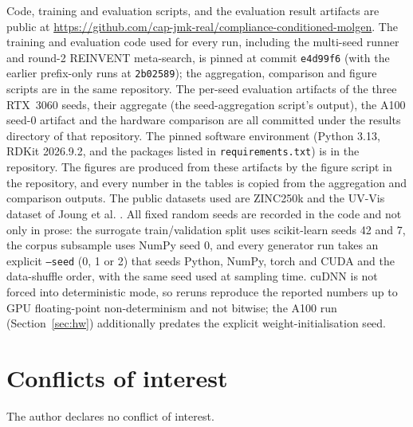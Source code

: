 \documentclass[11pt]{article}
\begin{document}
Code, training and evaluation scripts, and the evaluation result artifacts are public at
\url{https://github.com/cap-jmk-real/compliance-conditioned-molgen}. The training and
evaluation code used for every run, including the multi-seed runner and round-2
REINVENT meta-search, is pinned at commit \texttt{e4d99f6} (with the earlier prefix-only
runs at \texttt{2b02589}); the aggregation, comparison and figure scripts are in the same
repository. The per-seed evaluation artifacts of the three RTX~3060 seeds, their aggregate (the
seed-aggregation script's output), the A100 seed-0 artifact and the hardware comparison are
all committed under the results directory of that repository. The pinned software
environment (Python 3.13, RDKit 2026.9.2, and the packages listed in
\texttt{requirements.txt}) is in the repository. The figures are produced from these
artifacts by the figure script in the repository, and every number in the tables is
copied from the aggregation and comparison outputs. The public datasets used are ZINC250k
\cite{sterling2015zinc15} and the UV-Vis dataset of Joung et al. \cite{joung2020uvvis}. All
fixed random seeds are recorded in the code and not only in prose: the surrogate
train/validation split uses scikit-learn seeds 42 and 7, the corpus subsample uses NumPy
seed 0, and every generator run takes an explicit \texttt{--seed} (0, 1 or 2) that seeds
Python, NumPy, torch and CUDA and the data-shuffle order, with the same seed used at
sampling time. cuDNN is not forced into deterministic mode, so reruns reproduce the
reported numbers up to GPU floating-point non-determinism and not bitwise; the A100 run
(Section~\ref{sec:hw}) additionally predates the explicit weight-initialisation seed.

\section*{Conflicts of interest}

The author declares no conflict of interest.



\end{document}
